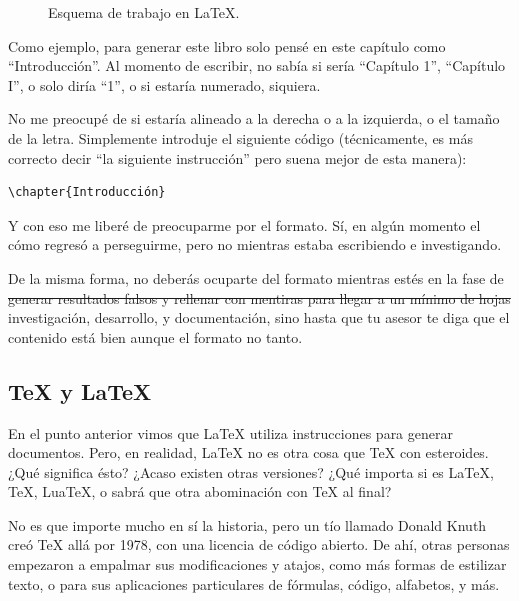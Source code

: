 \begin{figure}[ht!]
	
	\caption{Esquema de trabajo en \LaTeX.} %
	\label{fig:esquema_latex}
\end{figure}

Como ejemplo, para generar este libro solo pensé en este capítulo como ``Introducción''. Al momento de escribir, no sabía si sería ``Capítulo 1'', ``Capítulo I'', o solo diría ``1'', o si estaría numerado, siquiera.

No me preocupé de si estaría alineado a la derecha o a la izquierda, o el tamaño de la letra. Simplemente introduje el siguiente código (técnicamente, es más correcto decir ``la siguiente instrucción'' pero suena mejor de esta manera):

\begin{lstlisting}[style=latex]
\chapter{Introducción}
\end{lstlisting}

Y con eso me liberé de preocuparme por el formato. Sí, en algún momento el cómo regresó a perseguirme, pero no mientras estaba escribiendo e investigando.

De la misma forma, no deberás ocuparte del formato mientras estés en la fase de \st{generar resultados falsos y rellenar con mentiras para llegar a un m\'inimo de hojas} investigación, desarrollo, y documentación, sino hasta que tu asesor te diga que el contenido está bien aunque el formato no tanto.



\subsection{\TeX{} y \LaTeX{}}
\label{ssub:tex_latex}



En el punto anterior vimos que \LaTeX{} utiliza instrucciones para generar documentos. Pero, en realidad, \LaTeX{} no es otra cosa que \TeX{} con esteroides. ¿Qué significa ésto? ¿Acaso existen otras versiones? ¿Qué importa si es \LaTeX, \TeX, Lua\TeX, o sabrá que otra abominación con \TeX{} al final?

No es que importe mucho en sí la historia, pero un tío llamado Donald Knuth creó \TeX{} allá por 1978, con una licencia de código abierto. De ahí, otras personas empezaron a empalmar sus modificaciones y atajos, como más formas de estilizar texto, o para sus aplicaciones particulares de fórmulas, código, alfabetos, y más.

